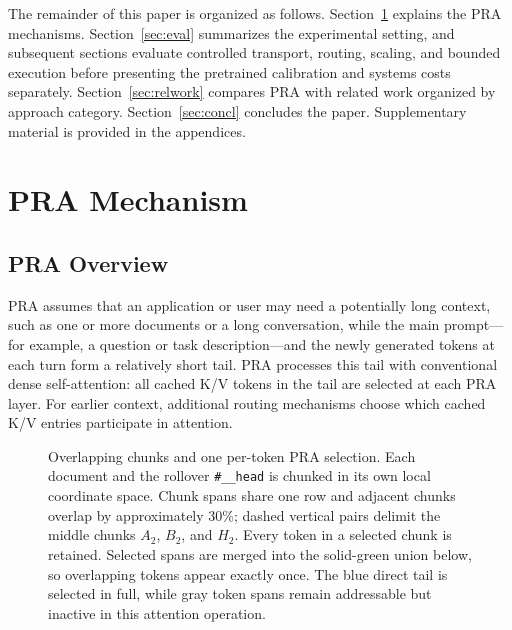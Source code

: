 \documentclass[11pt]{article}
\begin{document}
The remainder of this paper is organized as follows.
Section~\ref{sec:mechanism} explains the PRA mechanisms.
Section~\ref{sec:eval} summarizes the experimental setting, and subsequent sections
evaluate controlled transport, routing, scaling, and bounded execution before presenting
the pretrained calibration and systems costs separately.
Section~\ref{sec:relwork} compares PRA with related work organized by approach category.
Section~\ref{sec:concl} concludes the paper. Supplementary material is provided in the
appendices.



\section{PRA Mechanism}
\label{sec:mechanism}

\subsection{PRA Overview}
\label{sec:overview}

PRA assumes that an application or user may need a potentially long context, such as one
or more documents or a long conversation, while the main prompt---for example, a question
or task description---and the newly generated tokens at each turn form a relatively short
tail. PRA processes this tail with conventional dense self-attention: all cached K/V tokens
in the tail are selected at each PRA layer. For earlier context, additional routing
mechanisms choose which cached K/V entries participate in attention.

\begin{figure}[H]
\centering

\caption{Overlapping chunks and one per-token PRA selection. Each document and the
rollover \texttt{\#\_\_head} is chunked in its own local coordinate space. Chunk spans share
one row and adjacent chunks overlap by approximately 30\%; dashed vertical pairs delimit
the middle chunks $A_2$, $B_2$, and $H_2$. Every token in a selected chunk is retained.
Selected spans are merged into the solid-green union below, so overlapping tokens appear
exactly once. The blue direct tail is selected in full, while gray token spans remain
addressable but inactive in this attention operation.}
\label{fig:context-selection-line}
\end{figure}
\end{document}
